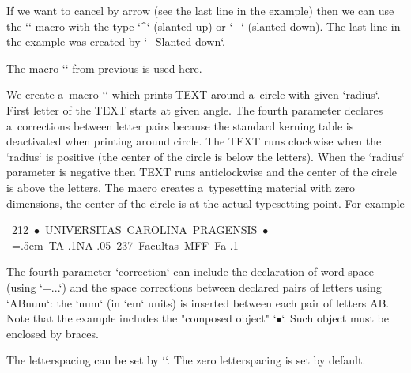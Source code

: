 If we want to cancel by arrow (see the last line in the example) then we can use the `\cancel` macro with the type `^` (slanted up) or `_` (slanted down). The last line in the example was created by `\cancel_{Slanted down}`. 



The macro `\arrowcc` from previous  is used here. 

\begtt
{} 
\def\arrowccparams{1 0 0 rg 1 0 0 RG .4 w 1 J}  %
\def\arrowccspike{4 0 m -.3 1 l -.3 -1 l h f} 
\endtt

 


We create a~macro `` which prints TEXT around a~circle with given `radius`. First letter of the TEXT starts at given angle. The fourth parameter declares a~corrections between letter pairs because the standard kerning table is deactivated when printing around circle. The TEXT runs clockwise when the `radius` is positive (the center of the circle is below the letters). When the `radius` parameter is negative then TEXT runs anticlockwise and the center of the circle is above the letters. The macro creates a~typesetting material with zero dimensions, the center of the circle is at the actual typesetting point. For example 




\begtt
\hbox{%
\circletext {1.7cm} {212}  {{$\bullet$} UNIVERSITAS CAROLINA PRAGENSIS {$\bullet$}} 
                           {\spaceskip=.5em \kpcirc TA{-.1}\kpcirc NA{-.05}} 
\circletext {-1.7cm} {237} {Facultas MFF} 
                           {\kpcirc Fa{-.1}} 
} 
\endtt


The fourth parameter `correction` can include the declaration of word space (using `\spaceskip=...`) and the space corrections between declared pairs of letters using `\kpcirc AB{num}`: the `\kern num` (in `em` units) is inserted between each pair of letters AB. Note that the example includes the "composed object" `$\bullet$`. Such object must be enclosed by braces. 



The letterspacing can be set by `\def\circletextS{\kern value}`. The zero letterspacing is set by default. 



